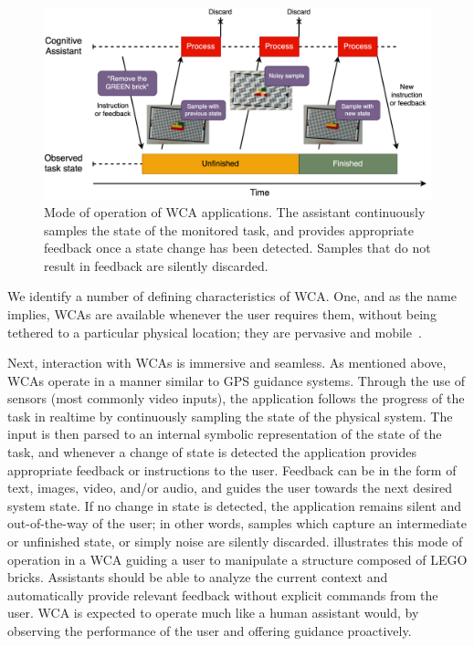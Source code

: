 \begin{figure}
    \centering
    \includegraphics[width=.9\textwidth]{Figs/wca_state}
    \caption{%
        Mode of operation of \gls{WCA} applications.
        The assistant continuously samples the state of the monitored task, and provides appropriate feedback once a state change has been detected.
        Samples that do not result in feedback are silently discarded.
    }\label{fig:wca}
\end{figure}

We identify a number of defining characteristics of \gls{WCA}.
One, and as the name implies, \glspl{WCA} are available whenever the user requires them, without being tethered to a particular physical location;
they are pervasive and mobile~\cite{ha2014towards}.

Next, interaction with \glspl{WCA} is immersive and seamless.
As mentioned above, \glspl{WCA} operate in a manner similar to \gls{GPS} guidance systems.
Through the use of sensors (most commonly video inputs), the application follows the progress of the task in realtime by continuously sampling the state of the physical system.
The input is then parsed to an internal symbolic representation of the state of the task, and whenever a change of state is detected the application provides appropriate feedback or instructions to the user.
Feedback can be in the form of text, images, video, and/or audio, and guides the user towards the next desired system state.
If no change in state is detected, the application remains silent and out-of-the-way of the user;
in other words, samples which capture an intermediate or unfinished state, or simply noise are silently discarded.
 illustrates this mode of operation in a \gls{WCA} guiding a user to manipulate a structure composed of LEGO bricks.
Assistants should be able to analyze the current context and automatically provide relevant feedback without explicit commands from the user.
\gls{WCA} is expected to operate much like a human assistant would, by observing the performance of the user and offering guidance proactively.

